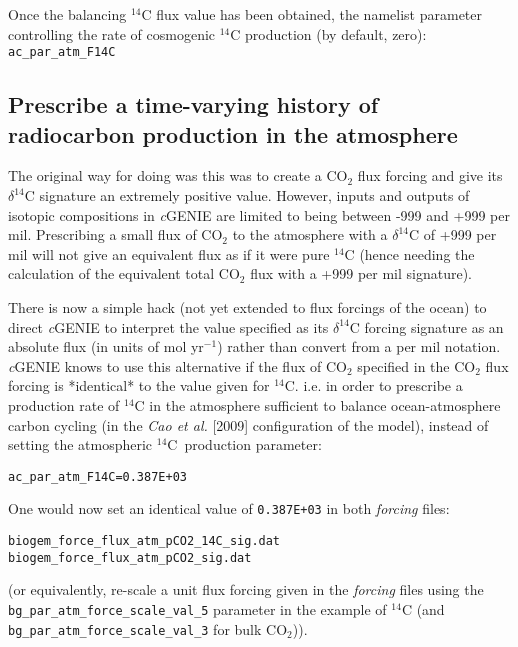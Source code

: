 \documentclass[11pt,fleqn]{book} %
\begin{document}
Once the balancing \(^{14}\)C flux value has been obtained,  the namelist parameter controlling the rate of cosmogenic \(^{14}\)C production (by default, zero): \texttt{ac\_par\_atm\_F14C}

%
\newpage
\subsection*{Prescribe a time-varying history of radiocarbon production in the atmosphere}
\vspace{1mm}

The original way for doing was this was to create a CO\(_{2}\) flux forcing and give its \(\delta^{14}\)C signature an extremely positive value. However, inputs and outputs of isotopic compositions in \textit{c}GENIE are limited to being between -999 and +999 per mil. Prescribing a small flux of CO\(_{2}\) to the atmosphere with a \(\delta^{14}\)C of +999 per mil will not give an equivalent flux as if it were pure \(^{14}\)C (hence needing the calculation of the equivalent total CO\(_{2}\) flux with a +999 per mil signature).

There is now a simple hack (not yet extended to flux forcings of the ocean) to direct \textit{c}GENIE to interpret the value specified as its \(\delta^{14}\)C forcing signature as an absolute flux (in units of mol yr\(^{-1}\)) rather than convert from a per mil notation. \textit{c}GENIE knows to use this alternative if the flux of CO\(_{2}\) specified in the CO\(_{2}\) flux forcing is *identical* to the value given for \(^{14}\)C. i.e. in order to prescribe a production rate of \(^{14}\)C in the atmosphere sufficient to balance ocean-atmosphere carbon cycling (in the \textit{Cao et al.} [2009] configuration of the model), instead of setting the atmospheric \(^{14}\)C\ production parameter:
\vspace{-2mm}\small\begin{verbatim}
ac_par_atm_F14C=0.387E+03
\end{verbatim}\normalsize\vspace{-2mm}

\noindent One would now set an identical value of \texttt{0.387E+03} in both \textit{forcing} files:
\vspace{-2mm}\small\begin{verbatim}
biogem_force_flux_atm_pCO2_14C_sig.dat
biogem_force_flux_atm_pCO2_sig.dat
\end{verbatim}\normalsize\vspace{-2mm}
(or equivalently, re-scale a unit flux forcing given in the \textit{forcing} files using the \texttt{bg\_par\_atm\_force\_scale\_val\_5} parameter in the example of \(^{14}\)C (and \texttt{bg\_par\_atm\_force\_scale\_val\_3} for bulk CO\(_{2}\))).
\end{document}
